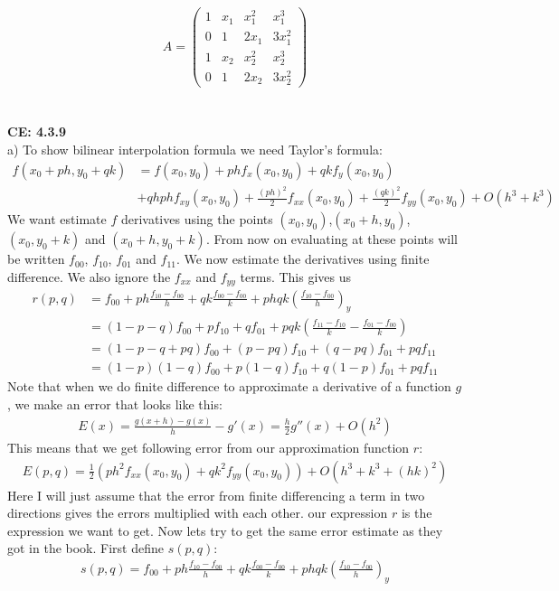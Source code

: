 \documentclass[11pt,a4paper]{report}
\begin{document}
$$ 
A = 
 \begin{pmatrix}
  1 & x_1 & x_1^2 &  x_1^3 \\
  0 & 1 & 2x_1 & 3x_1^2 \\
  1 & x_2 & x_2^2  & x_2^3  \\
  0 & 1 & 2x_2  & 3x_2^2 
 \end{pmatrix}
$$
\\
\\
\textbf{CE: 4.3.9}
\\
a) To show bilinear interpolation formula we need Taylor's formula:
\begin{align*}
f(x_0+ph,y_0+qk)&= f(x_0,y_0) + phf_x(x_0,y_0)+qkf_y(x_0,y_0)\\
&+qhphf_{xy}(x_0,y_0)+\frac{(ph)^2}{2}f_{xx}(x_0,y_0)+\frac{(qk)^2}{2}f_{yy}(x_0,y_0) +O(h^3+k^3)
\end{align*}
We want estimate $f$ derivatives using the points $(x_0,y_0)$,$(x_0+h,y_0)$,$(x_0,y_0+k)$ and $(x_0+h,y_0+k)$. From now on evaluating at these points will be written $f_{00}$, $f_{10}$, $f_{01}$ and $f_{11}$. We now estimate the derivatives using finite difference. We also ignore the $f_{xx}$ and $f_{yy}$ terms. This gives us 
\begin{align*}
r(p,q)&=f_{00} +ph\frac{f_{10}-f_{00}}{h}+qk\frac{f_{00}-f_{00}}{k} +phqk(\frac{f_{10}-f_{00}}{h})_y \\
&=(1-p-q)f_{00} + pf_{10}+qf_{01} +pqk(\frac{f_{11}-f_{10}}{k}-\frac{f_{01}-f_{00}}{k}) \\
&= (1-p-q+pq)f_{00} +(p-pq)f_{10}+(q-pq)f_{01}+ pqf_{11} \\
&=(1-p)(1-q)f_{00}+p(1-q)f_{10}+q(1-p)f_{01}+ pqf_{11}
\end{align*} 
Note that when we do finite difference to approximate a derivative of a function $g$, we make an error that looks like this:
\begin{align*}
E(x)=\frac{g(x+h)-g(x)}{h}-g'(x) = \frac{h}{2}g''(x) + O(h^2)
\end{align*} 
This means that we get following error from our approximation function $r$:
\begin{align*}
E(p,q) = \frac{1}{2}(ph^2f_{xx}(x_0,y_0)+qk^2f_{yy}(x_0,y_0)) +O(h^3+k^3+(hk)^2) 
\end{align*}
Here I will just assume that the error from finite differencing a term in two directions gives the errors multiplied with each other. our expression $r$ is the expression we want to get. Now lets try to get the same error estimate as they got in the book. First define $s(p,q)$:
\begin{align*}
s(p,q)= f_{00} +ph\frac{f_{10}-f_{00}}{h}+qk\frac{f_{00}-f_{00}}{k} +phqk(\frac{f_{10}-f_{00}}{h})_y
\end{align*}
\end{document}
